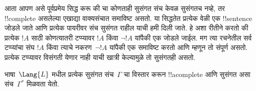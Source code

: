 \documentclass[../../../include/open-logic-section]{subfiles}
\begin{document}
      {}
      {}


\begin{explain}
आता आपण असे पूर्वप्रमेय सिद्ध करू की चा कोणताही सुसंगत
संच केवळ सुसंगतच नव्हे, तर !!{complete} असलेल्या एखाद्या वाक्यसंचात
समाविष्ट असतो. या सिद्धतेत प्रत्येक वेळी एक !!{sentence} जोडले जाते
आणि प्रत्येक पायरीवर संच सुसंगत राहील याची हमी दिली जाते. हे अशा रीतीने
करतो की प्रत्येक $!A$ साठी कोणत्यातरी टप्प्यावर $!A$ किंवा $\lnot
!A$ यांपैकी एक जोडले जाईल. मग त्या रचनेतील सर्व टप्प्यांचा संघ $!A$
किंवा त्याचे नकरण~$\lnot !A$ यांपैकी एक समाविष्ट करतो आणि म्हणून तो
संपूर्ण असतो. प्रत्येक टप्प्यावर विसंगती येणार नाही याची खात्री केल्यामुळे
तो सुसंगतही असतो.
\end{explain}

\begin{lem}[लिंडेनबाउमचे पूर्वप्रमेय]
 भाषा~$\Lang{L}$ मधील प्रत्येक सुसंगत
संच~$\Gamma$ चा विस्तार करून !!a{complete} आणि सुसंगत असा
संच~$\Gamma^*$ मिळवता येतो.
\end{lem}
\end{document}

